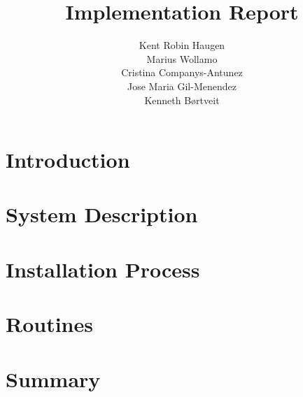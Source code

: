 \documentclass[a4, paper]{article}
\title{Implementation Report}
\author{Kent Robin Haugen \\ Marius Wollamo \\ Cristina Companys-Antunez \\ Jose Maria Gil-Menendez \\ Kenneth Børtveit}
\begin{document}
\maketitle
\section{Introduction}

\section{System Description}

\section{Installation Process}

\section{Routines}

\section{Summary}

\end{document}
